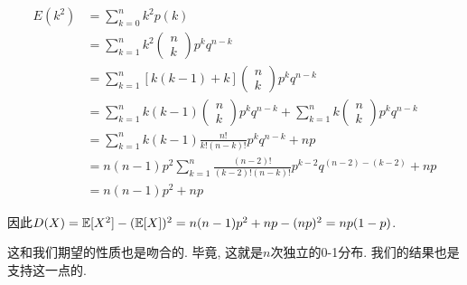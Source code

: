 $$\begin{aligned} E\left(k^2\right) & =\sum_{k=0}^n k^2 p(k) \\ & =\sum_{k=1}^n k^2\left(\begin{array}{l}n \\ k\end{array}\right) p^k q^{n-k} \\ & =\sum_{k=1}^n[{k}({k}-1)+{k}]\left(\begin{array}{l}n \\ k\end{array}\right) p^k q^{n-k} \\ & =\sum_{k=1}^n k(k-1)\left(\begin{array}{l}n \\ k\end{array}\right) p^k q^{n-k}+\sum_{k=1}^n k\left(\begin{array}{l}n \\ k\end{array}\right) p^k q^{n-k} \\ & =\sum_{k=1}^n k(k-1) \frac{n !}{k !(n-k) !} p^k q^{n-k}+n p \\ & =n(n-1) p^2 \sum_{k=1}^n \frac{(n-2) !}{(k-2) !(n-k) !} p^{k-2} q^{(n-2)-(k-2)}+n p \\ & =n(n-1) p^2+n p\end{aligned}$$

因此$D (X)=\mathbb E[X^2]-(\mathbb E[X])^2=n(n-1) p^2+n p-(n p)^2=n p(1-p)$. 

这和我们期望的性质也是吻合的. 毕竟, 这就是$n$次独立的0-1分布. 我们的结果也是支持这一点的. 






